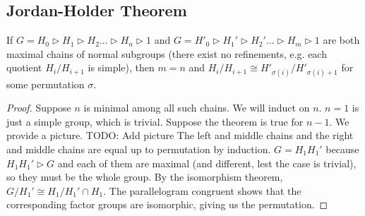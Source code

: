 \subsection{Jordan-Holder Theorem}
\begin{theorem}
    If $G = H_0 \triangleright H_1 \triangleright H_2 \dots \triangleright H_n \triangleright 1$
    and $G = H'_0 \triangleright H_1' \triangleright H_2' \dots \triangleright H_m \triangleright 1$
    are both maximal chains of normal subgroups (there exist no refinements, e.g. each quotient $H_i/H_{i + 1}$ is simple),
    then $m = n$ and $H_i/H_{i + 1} \cong H'_{\sigma(i)}/H'_{\sigma(i) + 1}$ for some permutation $\sigma$.
    \begin{proof}
        Suppose $n$ is minimal among all such chains. We will induct on $n$. $n = 1$ is just a simple group, which is trivial.
        Suppose the theorem is true for $n - 1$. We provide a picture.
        TODO: Add picture
        The left and middle chains and the right and middle chains are equal up to permutation by induction.
        $G = H_1 H_1'$ because $H_1 H_1' \triangleright G$ and each of them are maximal (and different, lest the case is trivial),
        so they must be the whole group. By the isomorphism theorem, $G/H_1' \cong H_1/H_1'\cap H_1$. The parallelogram congruent shows that the corresponding factor groups are isomorphic,
        giving us the permutation.
    \end{proof}
\end{theorem}